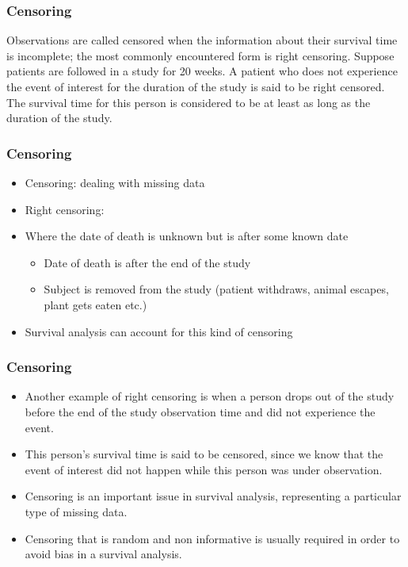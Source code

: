 \begin{frame}[fragile]
\frametitle{Censoring}	


Observations are called censored when the information about their survival time is incomplete; the most
commonly encountered form is right censoring. Suppose patients are followed in a study for 20 weeks.
A patient who does not experience the event of interest for the duration of the study is said to be right
censored. The survival time for this person is considered to be at least as long as the duration of the
study. 
\end{frame}
\begin{frame}[fragile]
	\frametitle{Censoring}
	\begin{itemize}
		\item
Censoring: dealing with missing data

\item Right censoring:

\item Where the date of death is unknown but is after some known date

\begin{itemize}
\item Date of death is after the end of the study
\item Subject is removed from the study (patient withdraws, animal escapes, plant gets eaten etc.)
\end{itemize}


\item Survival analysis can account for this kind of censoring
\end{itemize}
\end{frame}
\begin{frame}[fragile]
\frametitle{Censoring}
\begin{itemize}
\item Another example of right censoring is when a person drops out of the study before the end of the
	study observation time and did not experience the event.
	\item  This person’s survival time is said to be
	censored, since we know that the event of interest did not happen while this person was under
	observation. 
	\item Censoring is an important issue in survival analysis, representing a particular type of
	missing data. 
	\item Censoring that is random and non informative is usually required in order to avoid bias in
	a survival analysis. 
\end{itemize}


\end{frame}

